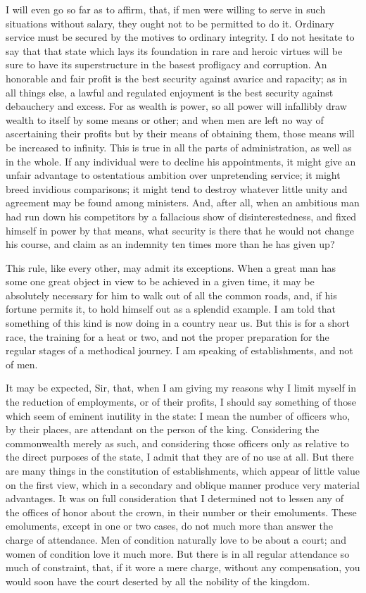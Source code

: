 I will even go so far as to affirm, that, if men were willing to serve in such situations without salary, they ought not to be permitted to do it. Ordinary service must be secured by the motives to ordinary integrity. I do not hesitate to say that that state which lays its foundation in rare and heroic virtues will be sure to have its superstructure in the basest profligacy and corruption. An honorable and fair profit is the best security against avarice and rapacity; as in all things else, a lawful and regulated enjoyment is the best security against debauchery and excess. For as wealth is power, so all power will infallibly draw wealth to itself by some means or other; and when men are left no way of ascertaining their profits but by their means of obtaining them, those means will be increased to infinity. This is true in all the parts of administration, as well as in the whole. If any individual were to decline his appointments, it might give an unfair advantage to ostentatious ambition over unpretending service; it might breed invidious comparisons; it might tend to destroy whatever little unity and agreement may be found among ministers. And, after all, when an ambitious man had run down his competitors by a fallacious show of disinterestedness, and fixed himself in power by that means, what security is there that he would not change his course, and claim as an indemnity ten times more than he has given up?

This rule, like every other, may admit its exceptions. When a great man has some one great object in view to be achieved in a given time, it may be absolutely necessary for him to walk out of all the common roads, and, if his fortune permits it, to hold himself out as a splendid example. I am told that something of this kind is now doing in a country near us. But this is for a short race, the training for a heat or two, and not the proper preparation for the regular stages of a methodical journey. I am speaking of establishments, and not of men.

It may be expected, Sir, that, when I am giving my reasons why I limit myself in the reduction of employments, or of their profits, I should say something of those which seem of eminent inutility in the state: I mean the number of officers who, by their places, are attendant on the person of the king. Considering the commonwealth merely as such, and considering those officers only as relative to the direct purposes of the state, I admit that they are of no use at all. But there are many things in the constitution of establishments, which appear of little value on the first view, which in a secondary and oblique manner produce very material advantages. It was on full consideration that I determined not to lessen any of the offices of honor about the crown, in their number or their emoluments. These emoluments, except in one or two cases, do not much more than answer the charge of attendance. Men of condition naturally love to be about a court; and women of condition love it much more. But there is in all regular attendance so much of constraint, that, if it wore a mere charge, without any compensation, you would soon have the court deserted by all the nobility of the kingdom.

